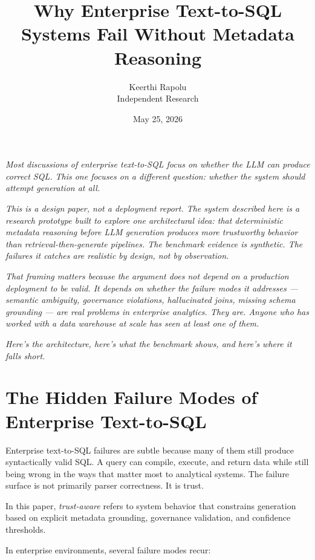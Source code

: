 \documentclass[11pt]{article}
\title{\textbf{Why Enterprise Text-to-SQL Systems Fail Without Metadata Reasoning}}
\author{Keerthi Rapolu\\Independent Research}
\date{May 25, 2026}
\begin{document}
\maketitle

\textit{Most discussions of enterprise text-to-SQL focus on whether the LLM can produce correct SQL. This one focuses on a different question: whether the system should attempt generation at all.}

\textit{This is a design paper, not a deployment report. The system described here is a research prototype built to explore one architectural idea: that deterministic metadata reasoning before LLM generation produces more trustworthy behavior than retrieval-then-generate pipelines. The benchmark evidence is synthetic. The failures it catches are realistic by design, not by observation.}

\textit{That framing matters because the argument does not depend on a production deployment to be valid. It depends on whether the failure modes it addresses --- semantic ambiguity, governance violations, hallucinated joins, missing schema grounding --- are real problems in enterprise analytics. They are. Anyone who has worked with a data warehouse at scale has seen at least one of them.}

\textit{Here's the architecture, here's what the benchmark shows, and here's where it falls short.}

\section{The Hidden Failure Modes of Enterprise Text-to-SQL}

Enterprise text-to-SQL failures are subtle because many of them still produce syntactically valid SQL. A query can compile, execute, and return data while still being wrong in the ways that matter most to analytical systems. The failure surface is not primarily parser correctness. It is trust.

In this paper, \emph{trust-aware} refers to system behavior that constrains generation based on explicit metadata grounding, governance validation, and confidence thresholds.

In enterprise environments, several failure modes recur:
\end{document}
